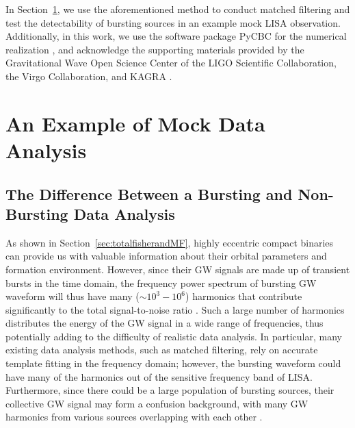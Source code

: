 \documentclass[%
 reprint,
 amsmath,amssymb,
 aps,
]{revtex4-2}
\newcommand{\xzy}[1]{\textcolor{red}{{\bf} #1}}
\begin{document}
In Section~\ref{sec:mockobservation}, we use the aforementioned method to conduct matched filtering and test the detectability of bursting sources in an example mock LISA observation. Additionally, in this work, we use the software package PyCBC for the numerical realization \citep{PYCBC_alex_nitz_2024_10473621}, and acknowledge the supporting materials provided by the Gravitational Wave Open Science Center of the LIGO Scientific Collaboration, the Virgo Collaboration, and KAGRA \citep{AlvinLi2023,LIGO2021SoftX..1300658A,LIGO2023tutorial}.






\section{An Example of Mock Data Analysis}
\label{sec:mockobservation}

\subsection{The Difference Between a Bursting and Non-Bursting Data Analysis}\label{sunsec:differenceofburstfitting}
As shown in Section~\ref{sec:totalfisherandMF}, highly eccentric compact binaries can provide us with valuable information about their orbital parameters and formation environment. However, since their GW signals are made up of transient bursts in the time domain, the frequency power spectrum of bursting GW waveform will thus have many ($\sim 10^3-10^6$) harmonics that contribute significantly to the total signal-to-noise ratio \citep[see, e.g., ][]{Kocsis_2012,Xuan+23b}. Such a large number of harmonics distributes the energy of the GW signal in a wide range of frequencies, thus potentially adding to the difficulty of realistic data analysis. In particular, many existing data analysis methods, such as matched filtering, rely on accurate template fitting in the frequency domain; however, the bursting waveform could have many of the harmonics out of the sensitive frequency band of LISA. Furthermore, since there could be a large population of bursting sources, their collective GW signal may form a confusion background, with many GW harmonics from various sources overlapping with each other \citep{Xuan+23b}. 
\end{document}

